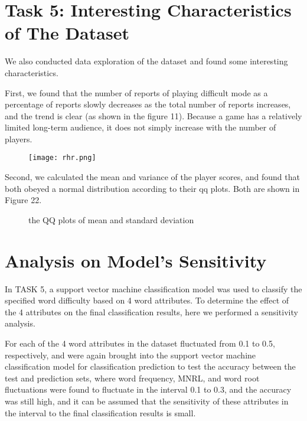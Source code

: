 \documentclass[12pt]{article}  %
\begin{document}
\section{Task 5: Interesting Characteristics of The Dataset}
We also conducted data exploration of the dataset and found some interesting characteristics.

First, we found that the number of reports of playing difficult mode as a percentage of reports slowly decreases as the total number of reports increases, and the trend is clear (as shown in the figure 11). Because a game has a relatively limited long-term audience, it does not simply increase with the number of players.
\begin{figure}[H]
	\centering
	\texttt{[image: rhr.png]}
	\caption{}
	\label{img11}
\end{figure}

Second, we calculated the mean and variance of the player scores, and found that both obeyed a normal distribution according to their qq plots. Both are shown in Figure 22.
\begin{figure}[H]
	\centering    
	\caption{the QQ plots of mean and standard deviation}		%
	\label{}									%
\end{figure}



	
	\section{Analysis on Model's Sensitivity}

	In TASK 5, a support vector machine classification model was used to classify the specified word difficulty based on 4 word attributes. To determine the effect of the 4 attributes on the final classification results, here we performed a sensitivity analysis.
	
	For each of the 4 word attributes in the dataset fluctuated from 0.1 to 0.5, respectively, and were again brought into the support vector machine classification model for classification prediction to test the accuracy between the test and prediction sets, where word frequency, MNRL, and word root fluctuations were found to fluctuate in the interval 0.1 to 0.3, and the accuracy was still high, and it can be assumed that the sensitivity of these attributes in the interval to the final classification results is small.
	
\end{document}
